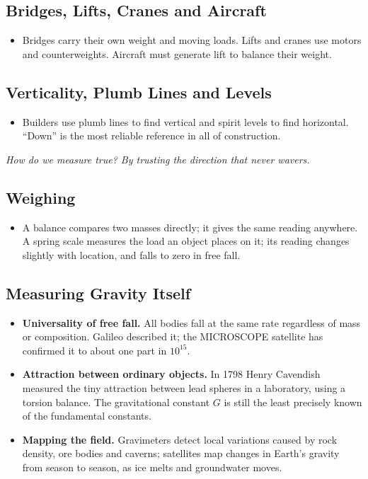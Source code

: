\documentclass[11pt,a4paper]{article}
\newcommand{\why}[1]{\par\textit{#1}\par}
\begin{document}
\subsection{Bridges, Lifts, Cranes and Aircraft}

\begin{itemize}
  \item Bridges carry their own weight and moving loads. Lifts and cranes use motors and counterweights. Aircraft must generate lift to balance their weight.
\end{itemize}

\subsection{Verticality, Plumb Lines and Levels}

\begin{itemize}
  \item Builders use plumb lines to find vertical and spirit levels to find horizontal. ``Down'' is the most reliable reference in all of construction.
\end{itemize}

\why{How do we measure true? By trusting the direction that never wavers.}

\subsection{Weighing}

\begin{itemize}
  \item A balance compares two masses directly; it gives the same reading anywhere. A spring scale measures the load an object places on it; its reading changes slightly with location, and falls to zero in free fall.
\end{itemize}

\subsection{Measuring Gravity Itself}

\begin{itemize}
  \item \textbf{Universality of free fall.} All bodies fall at the same rate regardless of mass or composition. Galileo described it; the MICROSCOPE satellite has confirmed it to about one part in $10^{15}$.
  \item \textbf{Attraction between ordinary objects.} In 1798 Henry Cavendish measured the tiny attraction between lead spheres in a laboratory, using a torsion balance. The gravitational constant $G$ is still the least precisely known of the fundamental constants.
  \item \textbf{Mapping the field.} Gravimeters detect local variations caused by rock density, ore bodies and caverns; satellites map changes in Earth's gravity from season to season, as ice melts and groundwater moves.
\end{itemize}
\end{document}
